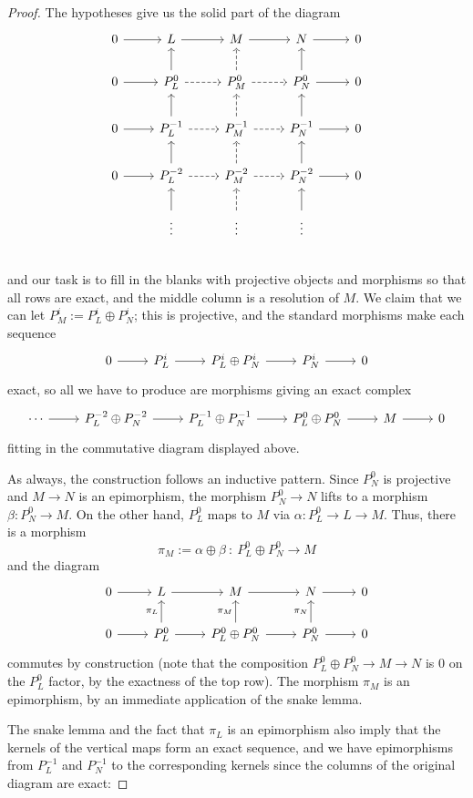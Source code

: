 \begin{proof}
The hypotheses give us the solid part of the diagram
\[\begin{tikzcd}
0\ar[r]&L\ar[r]&M\ar[r]&N\ar[r]&0\\
0\ar[r]&P^0_L\ar[u]\ar[r,dashed]&P^0_M\ar[u,dashed]\ar[r,dashed]&P^0_N\ar[u]\ar[r]&0\\
0\ar[r]&P^{-1}_L\ar[u]\ar[r,dashed]&P^{-1}_M\ar[u,dashed]\ar[r,dashed]&P^{-1}_N\ar[u]\ar[r]&0\\
0\ar[r]&P^{-2}_L\ar[u]\ar[r,dashed]&P^{-2}_M\ar[u,dashed]\ar[r,dashed]&P^{-2}_N\ar[u]\ar[r]&0\\
&\vdots\ar[u]&\vdots\ar[u,dashed]&\vdots\ar[u]&\\
\end{tikzcd}\]
and our task is to fill in the blanks with projective objects and morphisms so that all rows are exact, and the middle column is a resolution of $M$. We claim that we can let $P^i_M:=P^i_L\oplus P^i_N$; this is projective, and the standard morphisms make each sequence
\[\begin{tikzcd}
0\ar[r]&P^i_L\ar[r]&P^i_L\oplus P^i_N\ar[r]&P^i_N\ar[r]&0
\end{tikzcd}\]
exact, so all we have to produce are morphisms giving an exact complex
\[\begin{tikzcd}
\cdots\ar[r]&P_L^{-2}\oplus P_N^{-2}\ar[r]&P_L^{-1}\oplus P_N^{-1}\ar[r]&P_L^{0}\oplus P_N^{0}\ar[r]&M\ar[r]&0
\end{tikzcd}\]
fitting in the commutative diagram displayed above.\par
As always, the construction follows an inductive pattern. Since $P^0_N$ is projective and $M\to N$ is an epimorphism, the morphism $P^0_N\to N$ lifts to a morphism $\beta: P^0_N\to M$. On the other hand, $P^0_L$ maps to $M$ via $\alpha:P^0_L\to L\to M$. Thus, there is a morphism
\[\pi_M:=\alpha\oplus\beta\ :\ P^0_L\oplus P^0_N\to M\]
and the diagram
\[\begin{tikzcd}
0\ar[r]&L\ar[r]&M\ar[r]&N\ar[r]&0\\
0\ar[r]&P_L^0\ar[r]\ar[u,"\pi_L"]&P^0_L\oplus P^0_N\ar[u,"\pi_M"]\ar[r]&P^0_N\ar[r]\ar[u,"\pi_N"]&0
\end{tikzcd}\]
commutes by construction (note that the composition $P^0_L\oplus P^0_N\to M\to N$ is $0$ on the $P^0_L$ factor, by the exactness of the top row). The morphism $\pi_M$ is an epimorphism, by an immediate application of the snake lemma.\par
The snake lemma and the fact that $\pi_L$ is an epimorphism also imply that the kernels of the vertical maps form an exact sequence, and we have epimorphisms from $P^{-1}_L$ and $P^{-1}_N$ to the corresponding kernels since the columns of the original diagram are exact:

\end{proof}
